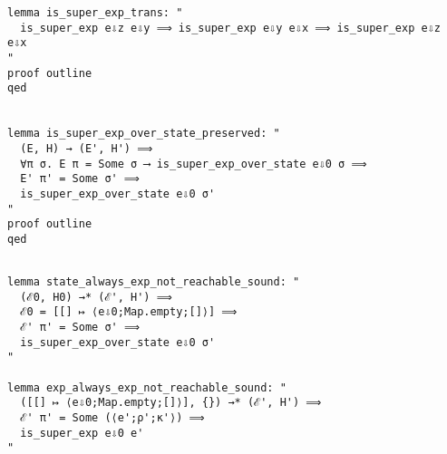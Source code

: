 \documentclass{article}
\begin{document}
\begin{lstlisting}[style=codestyle1, escapechar=\%]
lemma is_super_exp_trans: "
  is_super_exp e⇩z e⇩y ⟹ is_super_exp e⇩y e⇩x ⟹ is_super_exp e⇩z e⇩x
"
proof outline 
qed


lemma is_super_exp_over_state_preserved: "
  (E, H) → (E', H') ⟹
  ∀π σ. E π = Some σ ⟶ is_super_exp_over_state e⇩0 σ ⟹
  E' π' = Some σ' ⟹
  is_super_exp_over_state e⇩0 σ'
"
proof outline 
qed
  \end{lstlisting}


\begin{lstlisting}[style=codestyle1, escapechar=\%]

lemma state_always_exp_not_reachable_sound: "
  (ℰ0, H0) →* (ℰ', H') ⟹
  ℰ0 = [[] ↦ ⟨e⇩0;Map.empty;[]⟩] ⟹
  ℰ' π' = Some σ' ⟹
  is_super_exp_over_state e⇩0 σ'
"

lemma exp_always_exp_not_reachable_sound: "
  ([[] ↦ ⟨e⇩0;Map.empty;[]⟩], {}) →* (ℰ', H') ⟹
  ℰ' π' = Some (⟨e';ρ';κ'⟩) ⟹
  is_super_exp e⇩0 e'
" 
  \end{lstlisting}
\end{document}
